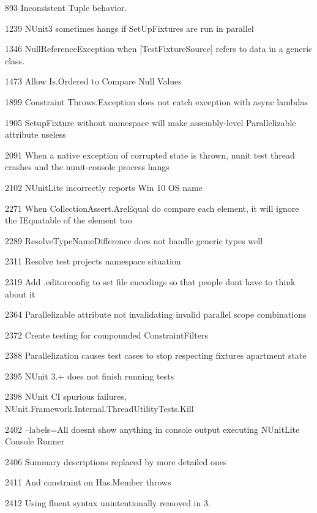 \begin{DoxyItemize}
\item 893 Inconsistent Tuple behavior.
\item 1239 N\+Unit3 sometimes hangs if Set\+Up\+Fixtures are run in parallel
\item 1346 Null\+Reference\+Exception when \mbox{[}Test\+Fixture\+Source\mbox{]} refers to data in a generic class.
\item 1473 Allow Is.\+Ordered to Compare Null Values
\item 1899 Constraint Throws.\+Exception does not catch exception with async lambdas
\item 1905 Setup\+Fixture without namespace will make assembly-\/level Parallelizable attribute useless
\item 2091 When a native exception of corrupted state is thrown, nunit test thread crashes and the nunit-\/console process hangs
\item 2102 N\+Unit\+Lite incorrectly reports Win 10 OS name
\item 2271 When Collection\+Assert.\+Are\+Equal do compare each element, it will ignore the I\+Equatable of the element too
\item 2289 Resolve\+Type\+Name\+Difference does not handle generic types well
\item 2311 Resolve test projects\textquotesingle{} namespace situation
\item 2319 Add .editorconfig to set file encodings so that people don\textquotesingle{}t have to think about it
\item 2364 Parallelizable attribute not invalidating invalid parallel scope combinations
\item 2372 Create testing for compounded Constraint\+Filters
\item 2388 Parallelization causes test cases to stop respecting fixture\textquotesingle{}s apartment state
\item 2395 N\+Unit 3.+ does not finish running tests
\item 2398 N\+Unit CI spurious failures, N\+Unit.\+Framework.\+Internal.\+Thread\+Utility\+Tests.\+Kill
\item 2402 --labels=All doesn\textquotesingle{}t show anything in console output executing N\+Unit\+Lite Console Runner
\item 2406 Summary descriptions replaced by more detailed ones
\item 2411 And constraint on Has.\+Member throws
\item 2412 Using fluent syntax unintentionally removed in 3.

\end{DoxyItemize}
